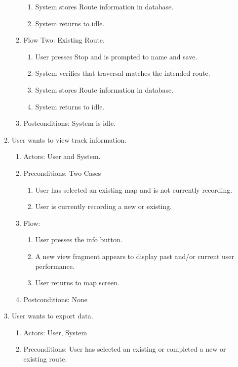 \documentclass{article}
\begin{document}
\begin{enumerate}
\begin{enumerate}
\begin{enumerate}
            \item System stores Route information in database.
            \item System returns to idle.
            \end{enumerate}
        \item Flow Two: Existing Route.
            \begin{enumerate}
            \item User presses Stop and is prompted to name and save.
            \item System verifies that traversal matches the intended route.
            \item System stores Route information in database.
            \item System returns to idle.
            \end{enumerate}
        \item Postconditions: System is idle.
    \end{enumerate}
\item User wants to view track information.
    \begin{enumerate}
        \item Actors: User and System.
        \item Preconditions: Two Cases
            \begin{enumerate}
            \item User has selected an existing map and is not currently recording.
            \item User is currently recording a new or existing.
            \end{enumerate}
        \item Flow:
            \begin{enumerate}
            \item User presses the info button.
            \item A new view fragment appears to display past and/or current user performance.
            \item User returns to map screen.
            \end{enumerate}
        \item Postconditions: None
    \end{enumerate}
\item User wants to export data.
    \begin{enumerate}
        \item Actors: User, System
        \item Preconditions: User has selected an existing or completed a new or existing route.

\end{enumerate}
\end{enumerate}
\end{document}
